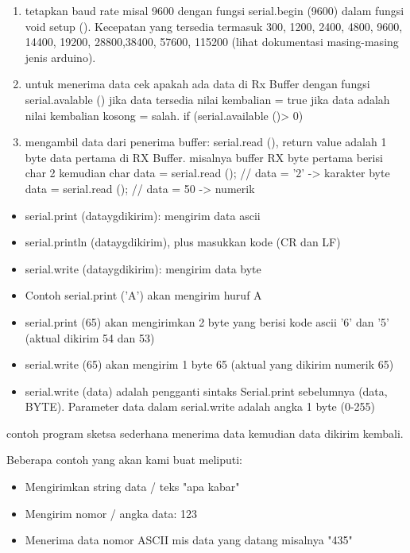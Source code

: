 \begin{enumerate}
\item tetapkan baud rate misal 9600 dengan fungsi serial.begin (9600) dalam fungsi void setup (). Kecepatan yang tersedia termasuk 300, 1200, 2400, 4800, 9600, 14400, 19200, 28800,38400, 57600, 115200 (lihat dokumentasi masing-masing jenis arduino).
\item untuk menerima data cek apakah ada data di Rx Buffer dengan fungsi serial.avalable ()
jika data tersedia nilai kembalian = true jika data adalah nilai kembalian kosong = salah.
if (serial.available ()> 0)
\item mengambil data dari penerima buffer: serial.read (), return value adalah 1 byte data pertama di RX Buffer.
misalnya buffer RX byte pertama berisi char 2
kemudian char data = serial.read (); // data = '2' -> karakter
byte data = serial.read (); // data = 50 -> numerik
\end{enumerate}

\begin{itemize}
Untuk mengirim data dapat digunakan
\item serial.print (dataygdikirim): mengirim data ascii
\item serial.println (dataygdikirim), plus masukkan kode (CR dan LF)
\item serial.write (dataygdikirim): mengirim data byte
\item Contoh serial.print ('A') akan mengirim huruf A
\item serial.print (65) akan mengirimkan 2 byte yang berisi kode ascii '6' dan '5' (aktual dikirim 54 dan 53)
\item serial.write (65) akan mengirim 1 byte 65 (aktual yang dikirim numerik 65)
\item serial.write (data) adalah pengganti sintaks Serial.print sebelumnya (data, BYTE). Parameter data dalam serial.write adalah angka 1 byte (0-255)
\end{itemize}

contoh program sketsa sederhana menerima data kemudian data dikirim kembali.


Beberapa contoh yang akan kami buat meliputi:

\begin{itemize}
\item Mengirimkan string data / teks "apa kabar"
\item Mengirim nomor / angka data: 123
\item Menerima data nomor ASCII mis data yang datang misalnya "435"
\end{itemize}

